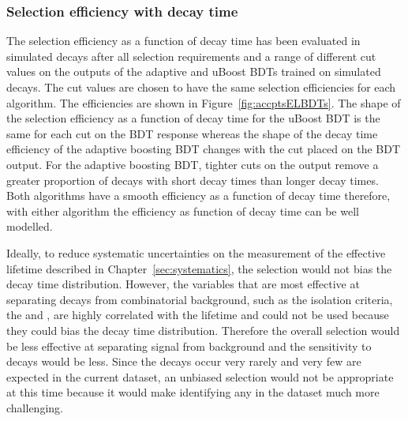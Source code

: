 \subsubsection{Selection efficiency with decay time}
\label{sec:seleff}
The selection efficiency as a function of decay time has been evaluated in simulated \bsmumu decays after all selection requirements and a range of different cut values on the outputs of the adaptive and uBoost BDTs trained on simulated decays. The cut values are chosen to have the same selection efficiencies for each algorithm. The efficiencies are shown in Figure~\ref{fig:accptsELBDTs}. The shape of the selection efficiency as a function of decay time for the uBoost BDT is the same for each cut on the BDT response whereas the shape of the decay time efficiency of the adaptive boosting BDT changes with the cut placed on the BDT output. For the adaptive boosting BDT, tighter cuts on the output remove a greater proportion of decays with short decay times than longer decay times. Both algorithms have a smooth efficiency as a function of decay time therefore, with either algorithm the efficiency as function of decay time can be well modelled.


Ideally, to reduce systematic uncertainties on the measurement of the effective lifetime described in Chapter~\ref{sec:systematics}, the selection would not bias the decay time distribution. However, the variables that are most effective at separating \bsmumu decays from combinatorial background, such as the isolation criteria, the \bs \chiIP and \chiFD, are highly correlated with the \bs lifetime and could not be used because they could bias the decay time distribution. 
Therefore the overall selection would be less effective at separating signal from background and the sensitivity to \bsmumu decays would be less. 
Since the \bsmumu decays occur very rarely and very few are expected in the current dataset, an unbiased selection would not be appropriate at this time because it would make identifying any \bsmumu in the dataset much more challenging. 

